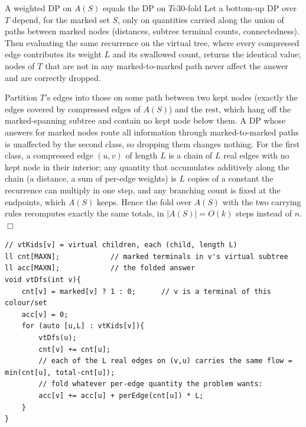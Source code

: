 \begin{theorem}{A weighted DP on \(A(S)\) equals the DP on \(T\)}{c30-fold}
Let a bottom-up DP over \(T\) depend, for the marked set \(S\), only on quantities
carried along the union of paths between marked nodes (distances, subtree terminal
counts, connectedness).  Then evaluating the same recurrence on the virtual tree,
where every compressed edge contributes its weight \(L\) and its swallowed count,
returns the identical value; nodes of \(T\) that are not in any marked-to-marked path
never affect the answer and are correctly dropped.
\end{theorem}
\begin{proofbox}
Partition \(T\)'s edges into those on some path between two kept nodes (exactly the
edges covered by compressed edges of \(A(S)\)) and the rest, which hang off the
marked-spanning subtree and contain no kept node below them.  A DP whose answers for
marked nodes route all information through marked-to-marked paths is unaffected by the
second class, so dropping them changes nothing.  For the first class, a compressed
edge \((u,v)\) of length \(L\) is a chain of \(L\) real edges with no kept node in
their interior; any quantity that accumulates additively along the chain (a distance,
a sum of per-edge weights) is \(L\) copies of a constant the recurrence can multiply
in one step, and any branching count is fixed at the endpoints, which \(A(S)\) keeps.
Hence the fold over \(A(S)\) with the two carrying rules recomputes exactly the same
totals, in \(|A(S)|=O(k)\) steps instead of \(n\). \(\Box\)
\end{proofbox}

\begin{lstlisting}[caption={The generic weighted fold on a virtual tree. Same shape as Ch.13's subtree template, but each child edge contributes a per-real-edge quantity times its length, and a subtree terminal count cnt[v]. ASCII only}, label={lst:c30-fold}]
// vtKids[v] = virtual children, each (child, length L)
ll cnt[MAXN];            // marked terminals in v's virtual subtree
ll acc[MAXN];            // the folded answer
void vtDfs(int v){
    cnt[v] = marked[v] ? 1 : 0;      // v is a terminal of this colour/set
    acc[v] = 0;
    for (auto [u,L] : vtKids[v]){
        vtDfs(u);
        cnt[v] += cnt[u];
        // each of the L real edges on (v,u) carries the same flow = min(cnt[u], total-cnt[u]);
        // fold whatever per-edge quantity the problem wants:
        acc[v] += acc[u] + perEdge(cnt[u]) * L;
    }
}
\end{lstlisting}

